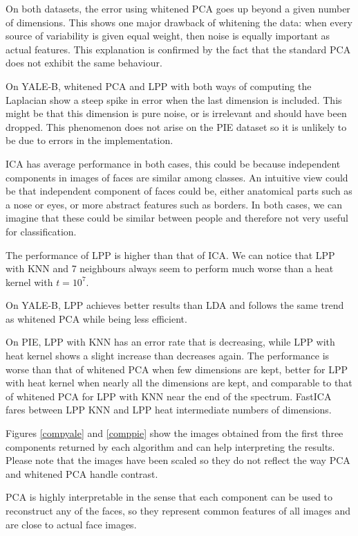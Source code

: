 \documentclass[10pt, a4paper]{article}
\begin{document}
On both datasets, the error using whitened PCA goes up beyond a given number of dimensions. This shows one major drawback of whitening the data: when every source of variability is given equal weight, then noise is equally important as actual features. This explanation is confirmed by the fact that the standard PCA does not exhibit the same behaviour.

On YALE-B, whitened PCA and LPP with both ways of computing the Laplacian show a steep spike in error when the last dimension is included. This might be that this dimension is pure noise, or is irrelevant and should have been dropped. This phenomenon does not arise on the PIE dataset so it is unlikely to be due to errors in the implementation.

ICA has average performance in both cases, this could be because independent components in images of faces are similar among classes. An intuitive view could be that independent component of faces could be, either anatomical parts such as a nose or eyes, or more abstract features such as borders. In both cases, we can imagine that these could be similar between people and therefore not very useful for classification.

The performance of LPP is higher than that of ICA. We can notice that LPP with KNN and 7 neighbours always seem to perform much worse than a heat kernel with $t = 10^7$.

On YALE-B, LPP achieves better results than LDA and follows the same trend as whitened PCA while being less efficient.

On PIE, LPP with KNN has an error rate that is decreasing, while LPP with heat kernel shows a slight increase than decreases again. The performance is worse than that of whitened PCA when few dimensions are kept, better for LPP with heat kernel when nearly all the dimensions are kept, and comparable to that of whitened PCA for LPP with KNN near the end of the spectrum. FastICA fares between LPP KNN and LPP heat intermediate numbers of dimensions.

\vspace{1em}

Figures \ref{compyale} and \ref{comppie} show the images obtained from the first three components returned by each algorithm and can help interpreting the results. Please note that the images have been scaled so they do not reflect the way PCA and whitened PCA handle contrast.

PCA is highly interpretable in the sense that each component can be used to reconstruct any of the faces, so they represent common features of all images and are close to actual face images.
\end{document}
